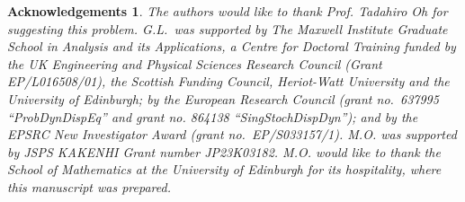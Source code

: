 \documentclass[letterpaper, 11pt,  reqno]{amsart}
\newcommand{\1}{\hspace{0.5mm}\text{I}\hspace{0.5mm}}
\newtheorem*{ackno}{Acknowledgements}
\numberwithin{equation}{section}
\numberwithin{theorem}{section}
\begin{document}
\begin{ackno}
\rm 
The authors would like to thank Prof. Tadahiro Oh for suggesting this problem.
G.L.~was supported by The Maxwell Institute Graduate School in Analysis and its Applications, 
a Centre for Doctoral Training funded by the UK Engineering and Physical Sciences Research Council (Grant EP/L016508/01), 
the Scottish Funding Council, Heriot-Watt University and the University of Edinburgh;
by the European Research Council (grant no.~637995 ``ProbDynDispEq'' and grant no. 864138 ``SingStochDispDyn'');
and by the EPSRC New Investigator Award (grant no.~EP/S033157/1).
M.O. was supported by JSPS KAKENHI Grant number JP23K03182.
M.O. would like to thank the School of Mathematics at the University of Edinburgh for its hospitality, where this manuscript was prepared.
\end{ackno}
\end{document}
